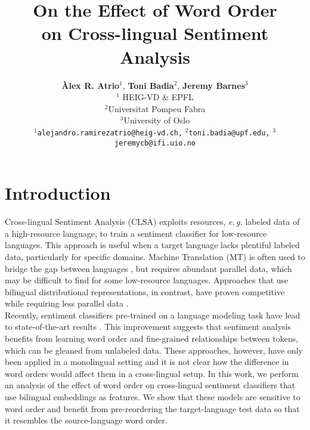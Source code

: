 \documentclass[a4paper,11pt,twocolumn,twoside]{article}
\title{On the Effect of Word Order\\on Cross-lingual Sentiment Analysis}
\author {\textbf{Àlex R. Atrio$^1$}, \textbf{Toni Badia$^{2}$}, \textbf{Jeremy Barnes$^{3}$}\\[5pt]
$^1$ HEIG-VD \& EPFL\\
$^2$Universitat Pompeu Fabra\\
$^3$University of Oslo\\[1pt]
{\tt $^1$alejandro.ramirezatrio@heig-vd.ch,}
{\tt $^2$toni.badia@upf.edu,}
{\tt $^3$jeremycb@ifi.uio.no}
}
\newcommand{\eg}{\textit{e.\,g.}\xspace}
\begin{document}

\setlength\titlebox{17cm} %


\label{firstpage} \maketitle

%


\section{Introduction}


Cross-lingual Sentiment Analysis (CLSA) exploits resources, \eg labeled data of a high-resource language, to train a sentiment classifier for low-resource languages. This approach is useful when a target language lacks plentiful labeled data, particularly for specific domains. Machine Translation (MT) is often used to bridge the gap between languages \cite{Banea2008,Balahur2014d}, but requires abundant parallel data, which may be difficult to find for some low-resource languages. Approaches that use bilingual distributional representations, in contrast, have proven competitive while requiring less parallel data \cite{Chen2016,Barnes2018b}.\\
\indent Recently, sentiment classifiers pre-trained on a language modeling task have lead to state-of-the-art results \cite{Peters2018,Howard2018,Devlin2018}. This improvement suggests that sentiment analysis benefits from learning word order and fine-grained relationships between tokens, which can be gleaned from unlabeled data. These approaches, however, have only been applied in a monolingual setting and it is not clear how the difference in word orders would affect them in a cross-lingual setup. In this work, we perform an analysis of the effect of word order on cross-lingual sentiment classifiers that use bilingual embeddings as features. We show that these models are sensitive to word order and benefit from pre-reordering the target-language test data so that it resembles the source-language word order.
\end{document}
